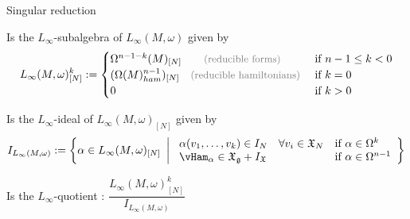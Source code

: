 \documentclass[beamer,10pt]{standalone}
\begin{document}

\begin{frame}{Singular reduction}
	\begin{defpropblock}
		Is the {\color{blue!70!black}$L_\infty$-subalgebra} of $L_\infty(M,\omega)$ given by
		\begin{displaymath}
			L_\infty(M,\omega)_{[N]}^k :=
			\begin{cases}
				\Omega^{n-1-k}(M)_{[N]} 
				\qquad\text{\color{gray}\small (reducible forms) }
				& \text{if } n-1\leq k < 0 \\
				(\Omega(M)_{ham}^{n-1})_{[N]} 
				\quad
				\text{\color{gray}\small (reducible hamiltonians) }
				& \text{if } k = 0 \\
				0 & \text{if } k > 0
			\end{cases}
		\end{displaymath}
	\end{defpropblock}

	\begin{defpropblock}
		Is the {\color{blue!70!black}$L_\infty$-ideal} of $L_\infty(M,\omega)_{[N]}$ given by
		\begin{displaymath}
			I_{L_\infty(M,\omega)} :=
			\left\lbrace
				\alpha \in L_\infty(M,\omega)_{[N]}
			~\left\vert~
				\begin{array}{l l}
					\alpha(v_1,\dots,v_k) \in I_N  \quad \forall v_i \in \X_N &
					\text{if}~ \alpha \in \Omega^k \\
					\vHam_\alpha \in \X_\g + I_\X &
					\text{if}~ \alpha \in \Omega^{n-1}
				\end{array}
			\right\rbrace\right.
		\end{displaymath}
	\end{defpropblock}

	\begin{defblock}
		Is the $L_\infty$-quotient : \quad
		$\dfrac{L_\infty(M,\omega)_{[N]}^k}{I_{L_\infty(M,\omega)}}$
	\end{defblock}

\end{frame}
\note[itemize]{
 \item
}
\end{document}
